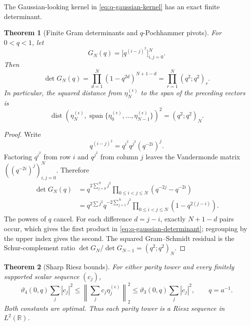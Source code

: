 \documentclass[11pt,oneside]{article}
\newtheorem{theorem}{Theorem}[section]
\theoremstyle{definition}
\theoremstyle{remark}
\newcommand{\norm}[1]{\left\lVert#1\right\rVert}
\newcommand{\R}{\mathbb{R}}
\begin{document}
The Gaussian-looking kernel in \eqref{eq:q-gaussian-kernel} has an exact finite determinant.

\begin{theorem}[Finite Gram determinants and \(q\)-Pochhammer pivots]
\label{thm:q-gaussian-determinant}
For \(0<q<1\), let
\[
  G_N(q)=\bigl[q^{(i-j)^2}\bigr]_{i,j=0}^{N}.
\]
Then
\begin{equation}
  \boxed{\quad
  \det G_N(q)=\prod_{d=1}^{N}(1-q^{2d})^{N+1-d}
            =\prod_{r=1}^{N}(q^2;q^2)_r.
  \quad}
  \label{eq:q-gaussian-determinant}
\end{equation}
In particular, the squared distance from \(\eta_N^{(\epsilon)}\) to the span of the preceding
vectors is
\begin{equation}
  \operatorname{dist}\!\left(\eta_N^{(\epsilon)},
      \operatorname{span}\{\eta_0^{(\epsilon)},\ldots,\eta_{N-1}^{(\epsilon)}\}\right)^2
   =(q^2;q^2)_N.
  \label{eq:gram-schmidt-pivot}
\end{equation}
\end{theorem}

\begin{proof}
Write
\[
 q^{(i-j)^2}=q^{i^2}q^{j^2}(q^{-2i})^j.
\]
Factoring \(q^{i^2}\) from row \(i\) and \(q^{j^2}\) from column \(j\) leaves the
Vandermonde matrix \(((q^{-2i})^j)_{i,j=0}^N\).  Therefore
\begin{align*}
 \det G_N(q)
 &=q^{2\sum_{j=0}^{N}j^2}
   \prod_{0\le i<j\le N}(q^{-2j}-q^{-2i})\\
 &=q^{2\sum j^2}q^{-2\sum_{j=1}^{N}j^2}
   \prod_{0\le i<j\le N}(1-q^{2(j-i)}).
\end{align*}
The powers of \(q\) cancel.  For each difference \(d=j-i\), exactly \(N+1-d\) pairs occur,
which gives the first product in \eqref{eq:q-gaussian-determinant}; regrouping by the upper
index gives the second.  The squared Gram--Schmidt residual is the Schur-complement ratio
\(\det G_N/\det G_{N-1}=(q^2;q^2)_N\).
\end{proof}

\begin{theorem}[Sharp Riesz bounds]
\label{thm:derivative-riesz-bounds}
For either parity tower and every finitely supported scalar sequence \((c_j)\),
\begin{equation}
 \vartheta_4(0,q)\sum_j|c_j|^2
 \le
 \norm{\sum_jc_j\eta_j^{(\epsilon)}}_2^2
 \le
 \vartheta_3(0,q)\sum_j|c_j|^2,
 \qquad q=a^{-1}.
 \label{eq:sharp-riesz-bounds}
\end{equation}
Both constants are optimal.  Thus each parity tower is a Riesz sequence in \(L^2(\R)\).
\end{theorem}
\end{document}
